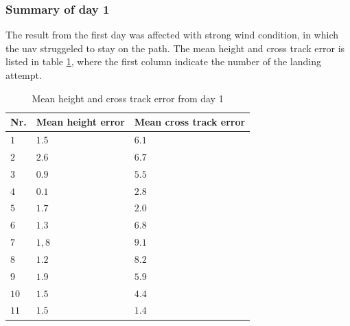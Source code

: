 \subsubsection{Summary of day 1}
The result from the first day was affected with strong wind condition, in which the \gls{uav} struggeled to stay on the path. The mean height and cross track error is listed in table \ref{tb:Day1HeightCrossTrack}, where the first column indicate the number of the landing attempt.
\begin{table}[H]
\centering
\begin{tabular}{| l | l | l |}
\hline
\textbf{Nr.} 	& \textbf{Mean height error} 	& \textbf{Mean cross track error}  \\ \hline
$1$				& $1.5$							& $6.1$								\\ \hline
$2$				& $2.6$							& $6.7$								\\ \hline
$3$				& $0.9$							& $5.5$								\\ \hline
$4$				& $0.1$							& $2.8$								\\ \hline
$5$				& $1.7$							& $2.0$								\\ \hline
$6$				& $1.3$							& $6.8$								\\ \hline
$7$				& $1,8$							& $9.1$								\\ \hline
$8$				& $1.2$							& $8.2$								\\ \hline
$9$				& $1.9$							& $5.9$								\\ \hline
$10$			& $1.5$							& $4.4$								\\ \hline
$11$			& $1.5$							& $1.4$								\\ \hline
\end{tabular}
\caption{Mean height and cross track error from day 1}
\label{tb:Day1HeightCrossTrack}
\end{table}
